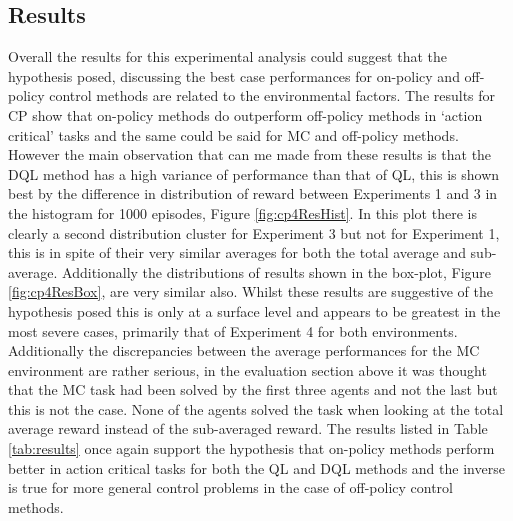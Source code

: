 \documentclass[hidelinks,journal]{IEEEtran}
\begin{document}
\subsection{Results}
\label{subsec:expRes}
Overall the results for this experimental analysis could suggest that the hypothesis posed, discussing the best case performances for on-policy and off-policy control methods are related to the environmental factors. The results for CP show that on-policy methods do outperform off-policy methods in ‘action critical’ tasks and the same could be said for MC and off-policy methods. However the main observation that can me made from these results is that the DQL method has a high variance of performance than that of QL, this is shown best by the difference in distribution of reward between Experiments 1 and 3 in the histogram for 1000 episodes, Figure \ref{fig:cp4ResHist}. In this plot there is clearly a second distribution cluster for Experiment 3 but not for Experiment 1, this is in spite of their very similar averages for both the total average and sub-average. Additionally the distributions of results shown in the box-plot, Figure \ref{fig:cp4ResBox}, are very similar also. Whilst these results are suggestive of the hypothesis posed this is only at a surface level and appears to be greatest in the most severe cases, primarily that of Experiment 4 for both environments. Additionally the discrepancies between the average performances for the MC environment are rather serious, in the evaluation section above it was thought that the MC task had been solved by the first three agents and not the last but this is not the case. None of the agents solved the task when looking at the total average reward instead of the sub-averaged reward. The results listed in Table \ref{tab:results} once again support the hypothesis that on-policy methods perform better in action critical tasks for both the QL and DQL methods and the inverse is true for more general control problems in the case of off-policy control methods.
\end{document}

